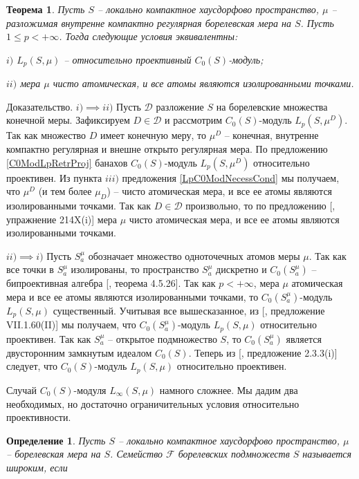 \documentclass[12pt]{article}
\numberwithin{equation}{subsection}
\theoremstyle{plain}
\newtheorem{theorem}{Теорема}
\newtheorem{definition}{Определение}
\newenvironment{proof}{Доказательство.}{}
\begin{document}
\begin{fulltext}
    \begin{theorem}\label{ReflLpC0ModCrit} Пусть $S$ -- локально компактное хаусдорфово пространство, $\mu$ -- разложимая внутренне компактно регулярная борелевская мера на $S$. Пусть $1\leq p< +\infty$. Тогда следующие условия эквивалентны:

        $i)$ $L_p(S,\mu)$ -- относительно проективный $C_0(S)$-модуль;

        $ii)$ мера $\mu$ чисто атомическая, и все атомы являются изолированными точками.
    \end{theorem}
    \begin{proof} $i)\implies ii)$ Пусть $\mathcal{D}$ разложение $S$ на борелевские множества конечной меры. Зафиксируем $D\in\mathcal{D}$ и рассмотрим $C_0(S)$-модуль $L_p(S,\mu^D)$. Так как множество $D$ имеет конечную меру, то $\mu^D$ -- конечная, внутренне компактно регулярная и внешне открыто регулярная мера. По предложению \ref{C0ModLpRetrProj} банахов $C_0(S)$-модуль $L_p(S,\mu^D)$ относительно проективен. Из пункта $iii)$ предложения \ref{LpC0ModNecessCond} мы получаем, что $\mu^D$ (и тем более $\mu_D$) -- чисто атомическая мера, и все ее атомы являются изолированными точками. Так как $D\in\mathcal{D}$ произвольно, то по предложению [\cite{FremMeasTh2}, упражнение 214X(i)] мера $\mu$ чисто атомическая мера, и все ее атомы являются изолированными точками.

        $ii)\implies i)$ Пусть $S_a^\mu$ обозначает множество одноточечных атомов меры $\mu$. Так как все точки в $S_a^\mu$ изолированы, то пространство $S_a^\mu$ дискретно и $C_0(S_a^\mu)$ -- бипроективная алгебра [\cite{HelHomolBanTopAlg}, теорема 4.5.26]. Так как $p<+\infty$, мера $\mu$  атомическая мера и все ее атомы являются изолированными точками, то $C_0(S_a^\mu)$-модуль $L_p(S,\mu)$ существенный. Учитывая все вышесказанное, из [\cite{HelBanLocConvAlg}, предложение VII.1.60(II)] мы получаем, что $C_0(S_a^\mu)$-модуль $L_p(S,\mu)$ относительно проективен. Так как $S_a^\mu$ -- открытое подмножество $S$, то $C_0(S_a^\mu)$ является двусторонним замкнутым идеалом  $C_0(S)$. Теперь из [\cite{RamsHomPropSemgroupAlg}, предложение 2.3.3(i)] следует, что $C_0(S)$-модуль $L_p(S,\mu)$ относительно проективен.
    \end{proof}

    Случай $C_0(S)$-модуля $L_\infty(S,\mu)$ намного сложнее. Мы дадим два необходимых, но достаточно ограничительных условия относительно проективности.

    \begin{definition}\label{WideFamilyDef} Пусть $S$ -- локально компактное хаусдорфово пространство, $\mu$ -- борелевская мера на $S$. Семейство $\mathcal{F}$ борелевских подмножеств $S$ называется широким, если


\end{definition}
\end{fulltext}
\end{document}
